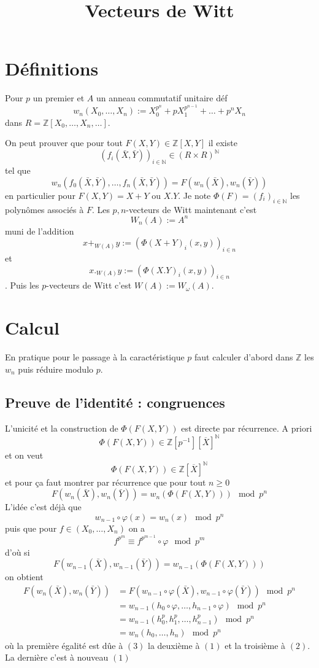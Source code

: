 \documentclass[a4paper,12pt]{article}
\title{Vecteurs de Witt}
\date{}
\newcommand{\Z}{\mathbb{Z}}
\newcommand{\N}{\mathbb{N}}
\theoremstyle{plain}
\theoremstyle{definition}
\theoremstyle{remark}
\begin{document}
\maketitle

\section{Définitions}
Pour $p$ un premier et $A$ un anneau commutatif
unitaire déf 
\[w_n(X_0,\ldots,X_n):=X_0^{p^n}+pX_1^{p^{n-1}}+\ldots+p^nX_n\]
dans $R=\Z[X_0,\ldots,X_n,\ldots]$.

On peut prouver que pour tout
$F(X,Y)\in \Z[X,Y]$ il existe 
\[(f_i(\bar X,\bar Y))_{i\in \N}\in (R\times R)^\N\] tel que
\[w_n(f_0(\bar X,\bar Y),\ldots, f_n(\bar X,\bar Y))=F(w_n(\bar X),w_n(\bar Y))\]
en particulier pour $F(X,Y)=X+Y$ ou $X.Y$. Je note 
$\Phi(F)=(f_i)_{i\in \N}$ les polynômes associés à $F$. 
Les $p,n$-vecteurs de Witt maintenant c'est
\[W_n(A):=A^n\]
muni de l'addition \[x+_{W(A)}y:=(\Phi(X+Y)_i(x,y))_{i\in n}\] et
\[x._{W(A)}y:=(\Phi(X.Y)_i(x,y))_{i\in n}\]. Puis les
$p$-vecteurs de Witt c'est $W(A):=W_{\omega}(A)$.

\section{Calcul}
En pratique pour le passage à la caractéristique $p$ faut calculer
d'abord dans $\Z$ les $w_n$ puis réduire modulo $p$. 

\subsection{Preuve de l'identité : congruences}
L'unicité et la construction de $\Phi(F(X,Y))$ est directe par 
récurrence. A priori 
\[\Phi(F(X,Y))\in \Z[p^{-1}][\overline X]^\N\]
et on veut 
\[\Phi(F(X,Y))\in \Z[\overline X]^\N\]
et pour ça faut montrer par récurrence que pour tout $n\geq 0$
\[F(w_n(\bar X),w_n(\bar Y))=w_n(\Phi(F(X,Y)))\mod p^n\]
L'idée c'est déjà que
\begin{equation}
w_{n-1}\circ\varphi(x)=w_n(x)\mod p^n
\end{equation}
puis que pour $f\in (X_0,\ldots, X_n)$ on a 
\begin{equation}
f^{p^m}\equiv f^{p^{m-1}}\circ\varphi\mod p^m
\end{equation}
d'où si 
\begin{equation}
F(w_{n-1}(\bar X),w_{n-1}(\bar Y))= w_{n-1}(\Phi(F(X,Y)))
\end{equation}
on obtient 
\begin{align*}
  F(w_n(\bar X),w_n(\bar Y))&=F(w_{n-1}\circ\varphi(\bar X),w_{n-1}\circ\varphi(\bar Y))\mod p^n\\
                            &=w_{n-1}(h_0\circ\varphi,\ldots, h_{n-1}\circ\varphi)\mod p^n\\
                            &=w_{n-1}(h_0^p,h_1^p,\ldots, h_{n-1}^p)\mod p^n\\
                            &=w_n(h_0,\ldots, h_n)\mod p^n
\end{align*}
où la première égalité est dûe à $(3)$ la deuxième à $(1)$ et 
la troisième à $(2)$. La dernière c'est à nouveau $(1)$
\end{document}
